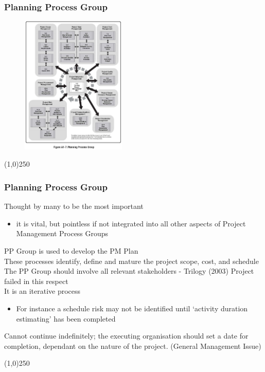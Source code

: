 \begin{frame}
\frametitle{Planning Process Group}
 \begin{figure}
 	\centering
 		\includegraphics[width = 5cm]{images/FigA1-7.jpg}
 	\label{fig:A1-7}
 \end{figure}
\end{frame}
\begin{center}\line(1,0){250}\end{center}



\begin{frame}
\frametitle{Planning Process Group}
Thought by many to be the most important\\
\begin{itemize}
	\item it is vital, but pointless if not integrated into all other aspects of Project Management Process Groups
\end{itemize}
PP Group is used to develop the PM Plan\\
These processes identify, define and mature the project scope, cost, and schedule\\
The PP Group should involve all relevant stakeholders - Trilogy (2003) Project failed in this respect\\
It is an iterative process\\
\begin{itemize}
	\item For instance a schedule risk may not be identified until `activity duration estimating' has been completed
\end{itemize}
Cannot continue indefinitely; the executing organisation should set a date for completion, dependant on the nature of the project. (General Management Issue)\\
\end{frame}
\begin{center}\line(1,0){250}\end{center}



